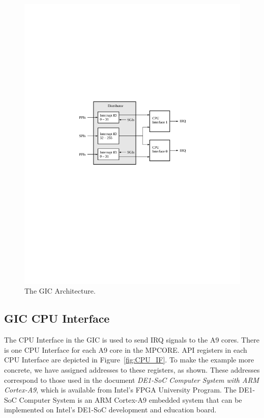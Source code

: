 \documentclass[11pt, twoside, pdftex]{article}
\begin{document}
\begin{figure}[h!]
   \begin{center}
       \includegraphics{figures/GIC.pdf}
   \end{center}
   \caption{The GIC Architecture.}
	\label{fig:fig_GIC}
\end{figure}

\subsection{GIC CPU Interface}
\label{sec:CPU_IF} The CPU Interface in the GIC is used to send IRQ signals to the A9
cores. There is one CPU Interface for each A9 core in the MPCORE.  API registers 
in each CPU Interface are depicted in Figure~\ref{fig:CPU_IF}. To make the example more
concrete, we have assigned addresses to these registers, as shown. These addresses
correspond to those used in the document {\it DE1-SoC Computer System with ARM Cortex-A9},
which is available from Intel's FPGA University Program. The DE1-SoC Computer System is an ARM
Cortex-A9 embedded system that can be implemented on Intel's DE1-SoC development and
education board. 
\end{document}
